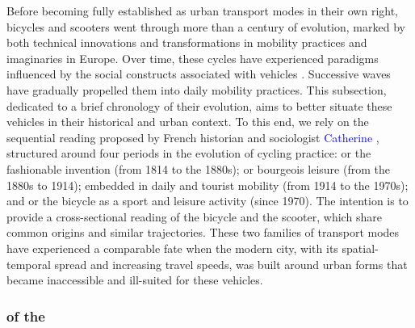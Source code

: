 \begin{refsegment}
Before becoming fully established as urban transport modes in their own right, bicycles and scooters went through more than a century of evolution, marked by both technical innovations and transformations in mobility practices and imaginaries in Europe. Over time, these cycles have experienced paradigms influenced by the social constructs associated with vehicles \textcolor{blue}{\autocite[13]{heran_retour_2015}}. Successive waves have gradually propelled them into daily mobility practices. This subsection, dedicated to a brief chronology of their evolution, aims to better situate these vehicles in their historical and urban context. To this end, we rely on the sequential reading proposed by French historian and sociologist \textcolor{blue}{Catherine} \textcolor{blue}{\textcite[]{bertho-lavenir_voyages_2011}}, structured around four periods in the evolution of cycling practice:  or the fashionable invention (from 1814 to the 1880s);  or bourgeois leisure (from the 1880s to 1914);  embedded in daily and tourist mobility (from 1914 to the 1970s); and  or the bicycle as a sport and leisure activity (since 1970). The intention is to provide a cross-sectional reading of the bicycle and the scooter, which share common origins and similar trajectories. These two families of transport modes have experienced a comparable fate when the modern city, with its spatial-temporal spread and increasing travel speeds, was built around urban forms that became inaccessible and ill-suited for these vehicles.%

\subsubsection*{ of the 
    \label{chap1:proximite-velo-trottinette-chronologie}
    }


\end{refsegment}
